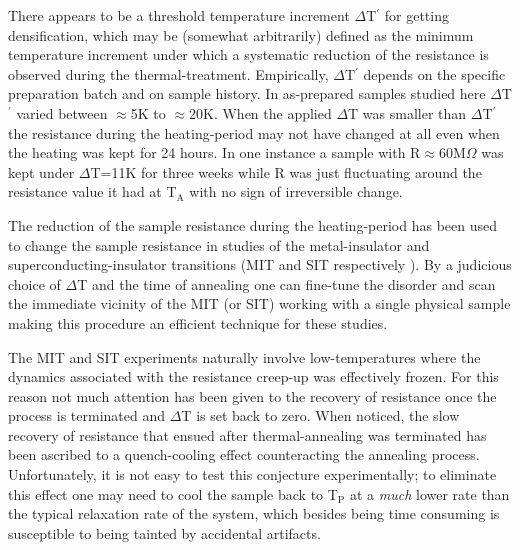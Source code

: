 \documentclass
[preprint,showpacs,byrevtex,10pt,twocolumn,tightenlines,prl,letterpaper]{revtex4}%
\begin{document}
There appears to be a threshold temperature increment $\Delta$T$^{\prime}$ for
getting densification, which may be (somewhat arbitrarily) defined as the
minimum temperature increment under which a systematic reduction of the
resistance is observed during the thermal-treatment. Empirically, $\Delta
$T$^{\prime}$ depends on the specific preparation batch and on sample history.
In as-prepared samples studied here $\Delta$T$^{\prime}$ varied between
$\approx$5K to $\approx$20K. When the applied $\Delta$T was smaller than
$\Delta$T$^{\prime}$ the resistance during the heating-period may not have
changed at all even when the heating was kept for 24 hours. In one instance a
sample with R$\approx$60M$\Omega$ was kept under $\Delta$T=11K for three weeks
while R was just fluctuating around the resistance value it had at
T$_{\text{A}}$ with no sign of irreversible change.

The reduction of the sample resistance during the heating-period has been used
to change the sample resistance in studies of the metal-insulator and
superconducting-insulator transitions (MIT and SIT respectively \cite{16}). By
a judicious choice of $\Delta$T and the time of annealing one can fine-tune
the disorder and scan the immediate vicinity of the MIT (or SIT) working with
a single physical sample making this procedure an efficient technique for
these studies.

The MIT and SIT experiments naturally involve low-temperatures where the
dynamics associated with the resistance creep-up was effectively frozen. For
this reason not much attention has been given to the recovery of resistance
once the process is terminated and $\Delta$T is set back to zero. When
noticed, the slow recovery of resistance that ensued after thermal-annealing
was terminated has been ascribed to a quench-cooling effect counteracting the
annealing process. Unfortunately, it is not easy to test this conjecture
experimentally; to eliminate this effect one may need to cool the sample back
to T$_{\text{P}}$ at a \textit{much} lower rate than the typical relaxation
rate of the system, which besides being time consuming is susceptible to being
tainted by accidental artifacts.
\end{document}
